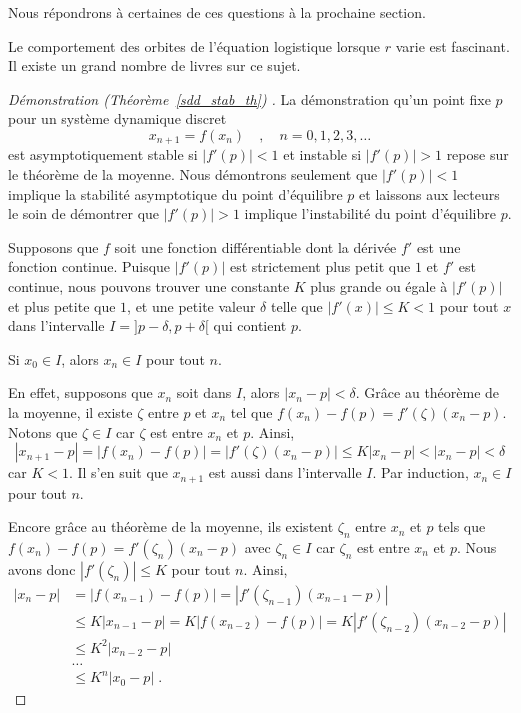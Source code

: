 {\begin{rmk}
Nous répondrons à certaines de ces questions à la prochaine section.

Le comportement des orbites de l'équation logistique lorsque $r$ varie
est fascinant.   Il existe un grand nombre de livres sur ce sujet.
\end{rmk}

\begin{proof}[Démonstration (Théorème~\ref{sdd_stab_th}) \theory]
La démonstration qu'un point fixe $p$ pour un système dynamique discret
\[
x_{n+1} = f(x_n) \quad , \quad n=0, 1, 2, 3, \ldots
\]
est asymptotiquement stable si $|f'(p)|<1$ et instable si $|f'(p)|>1$
repose sur le théorème de la moyenne.  Nous démontrons seulement que
$|f'(p)|<1$ implique la stabilité asymptotique du point d'équilibre
$p$ et laissons aux lecteurs le soin de démontrer que $|f'(p)|>1$
implique l'instabilité du point d'équilibre $p$.

Supposons que $f$ soit une fonction différentiable dont la dérivée
$f'$ est une fonction continue.  Puisque $|f'(p)|$ est strictement
plus petit que $1$ et $f'$ est continue, nous pouvons trouver une constante
$K$ plus grande ou égale à $|f'(p)|$ et plus petite que $1$, et une
petite valeur $\delta$ telle que $|f'(x)| \leq K<1$ pour tout $x$ dans
l'intervalle $I = ]p-\delta, p+\delta[$ qui contient $p$.

 Si $x_0 \in I$, alors $x_n \in I$ pour tout $n$.

En effet, supposons que $x_n$ soit dans $I$, alors $|x_n-p|<\delta$.  Grâce
au théorème de la moyenne, il existe $\zeta$ entre $p$ et $x_n$ tel que
$f(x_n) - f(p) = f'(\zeta)(x_n - p)$.  Notons que $\zeta \in I$ car $\zeta$
est entre $x_n$ et $p$.  Ainsi,
\[
|x_{n+1} - p| = |f(x_n) - f(p)| = |f'(\zeta)(x_n - p)|
\leq K | x_n - p | < |x_n - p| < \delta
\]
car $K<1$.  Il s'en suit que $x_{n+1}$ est aussi dans l'intervalle $I$.
Par induction, $x_n \in I$ pour tout $n$.

 Encore grâce au théorème de la moyenne, ils existent $\zeta_n$
entre $x_n$ et $p$ tels que
$f(x_n) - f(p) = f'(\zeta_n)(x_n - p)$
avec $\zeta_n \in I$ car $\zeta_n$ est entre $x_n$ et $p$.  Nous avons donc
$|f'(\zeta_n)|\leq K$ pour tout $n$.  Ainsi,
\begin{align*}
|x_n -p| &= |f(x_{n-1}) - f(p)| = |f'(\zeta_{n-1})(x_{n-1} - p)|\\
&\leq K |x_{n-1} - p| = K |f(x_{n-2}) - f(p)|
= K |f'(\zeta_{n-2})(x_{n-2} - p)| \\
&\leq K^2 |x_{n-2} -p|\\
& \ldots\\
&\leq K^n |x_0 - p| \; .
\end{align*}


\end{proof}}
